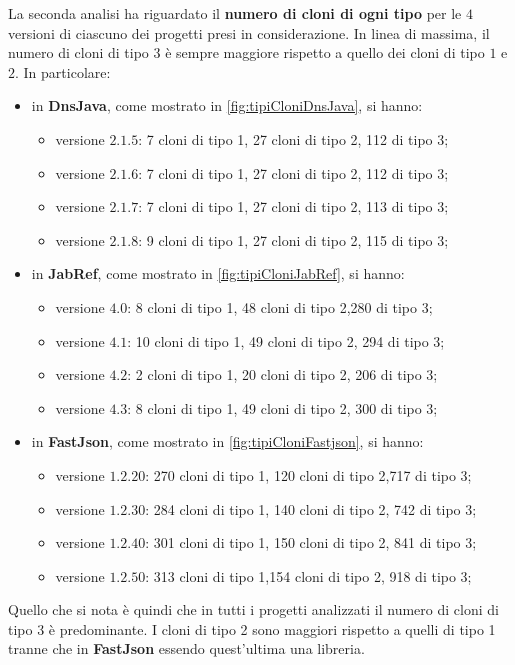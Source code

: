 La seconda analisi ha riguardato il \textbf{numero di cloni di ogni tipo} per le $4$ versioni di ciascuno dei progetti presi in considerazione. In linea di massima, il numero di cloni di tipo $3$ è sempre maggiore rispetto a quello dei cloni di tipo $1$ e $2$. In particolare:
\begin{itemize}
	\item in \textbf{DnsJava}, come mostrato in \autoref{fig:tipiCloniDnsJava}, si hanno:
		\begin{itemize}
				\item versione $2.1.5$: 7 cloni di tipo 1, 27 cloni di tipo 2, 112 di tipo 3;
				\item versione $2.1.6$: 7 cloni di tipo 1, 27 cloni di tipo 2, 112 di tipo 3;
				\item versione $2.1.7$: 7 cloni di tipo 1, 27 cloni di tipo 2, 113 di tipo 3;
				\item versione $2.1.8$: 9 cloni di tipo 1, 27 cloni di tipo 2, 115 di tipo 3;		
		\end{itemize}
	\item in \textbf{JabRef}, come mostrato in \autoref{fig:tipiCloniJabRef}, si hanno:
				\begin{itemize}
			\item versione $4.0$: 8 cloni di tipo 1, 48 cloni di tipo 2,280 di tipo 3;
			\item versione $4.1$: 10 cloni di tipo 1, 49 cloni di tipo 2, 294 di tipo 3;
			\item versione $4.2$: 2 cloni di tipo 1, 20 cloni di tipo 2, 206 di tipo 3;
			\item versione $4.3$: 8 cloni di tipo 1, 49 cloni di tipo 2, 300 di tipo 3;		
		\end{itemize}
	\item in \textbf{FastJson}, come mostrato in \autoref{fig:tipiCloniFastjson}, si hanno:
	\begin{itemize}
		\item versione $1.2.20$: 270 cloni di tipo 1, 120 cloni di tipo 2,717 di tipo 3;
		\item versione $1.2.30$: 284 cloni di tipo 1, 140 cloni di tipo 2, 742 di tipo 3;
		\item versione $1.2.40$: 301 cloni di tipo 1, 150 cloni di tipo 2, 841 di tipo 3;
		\item versione $1.2.50$: 313 cloni di tipo 1,154 cloni di tipo 2, 918 di tipo 3;		
	\end{itemize}
\end{itemize}
Quello che si nota è quindi che in tutti i progetti analizzati il numero di cloni di tipo 3 è predominante. I cloni di tipo 2 sono maggiori rispetto a quelli di tipo 1 tranne che in \textbf{FastJson} essendo quest'ultima una libreria.
